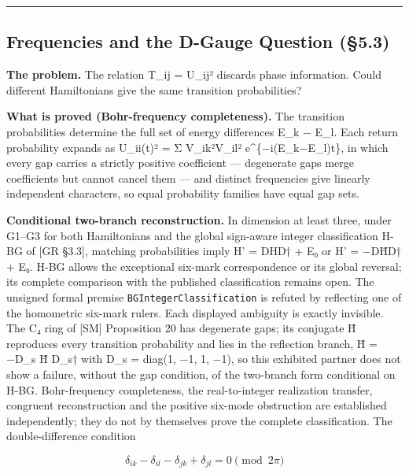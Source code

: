 \documentclass[
]{article}
\begin{document}
\begin{center}\rule{0.5\linewidth}{0.5pt}\end{center}

\hypertarget{frequencies-and-the-d-gauge-question-5.3}{%
\subsection{Frequencies and the D-Gauge Question
(§5.3)}\label{frequencies-and-the-d-gauge-question-5.3}}

\textbf{The problem.} The relation T\_ij = \textbar U\_ij\textbar²
discards phase information. Could different Hamiltonians give the same
transition probabilities?

\textbf{What is proved (Bohr-frequency completeness).} The transition
probabilities determine the full set of energy differences E\_k − E\_l.
Each return probability expands as \textbar U\_ii(t)\textbar² = Σ
\textbar V\_ik\textbar²\textbar V\_il\textbar² e\^{}\{−i(E\_k−E\_l)t\},
in which every gap carries a strictly positive coefficient ---
degenerate gaps merge coefficients but cannot cancel them --- and
distinct frequencies give linearly independent characters, so equal
probability families have equal gap sets.

\textbf{Conditional two-branch reconstruction.} In dimension at least
three, under G1--G3 for both Hamiltonians and the global sign-aware
integer classification H-BG of {[}GR §3.3{]}, matching probabilities
imply H' = DHD† + E₀ or H' = −DH̄D† + E₀. H-BG allows the exceptional
six-mark correspondence or its global reversal; its complete comparison
with the published classification remains open. The unsigned formal
premise \texttt{BGIntegerClassification} is refuted by reflecting one of
the homometric six-mark rulers. Each displayed ambiguity is exactly
invisible. The C₄ ring of {[}SM{]} Proposition 20 has degenerate gaps;
its conjugate H̄ reproduces every transition probability and lies in the
reflection branch, H̄ = −D\_s H̄ D\_s† with D\_s = diag(1, −1, 1, −1), so
this exhibited partner does not show a failure, without the gap
condition, of the two-branch form conditional on H-BG. Bohr-frequency
completeness, the real-to-integer realization transfer, congruent
reconstruction and the positive six-mode obstruction are established
independently; they do not by themselves prove the complete
classification. The double-difference condition

\[\delta_{ik} - \delta_{il} - \delta_{jk} + \delta_{jl} = 0 \pmod{2\pi}\]
\end{document}

